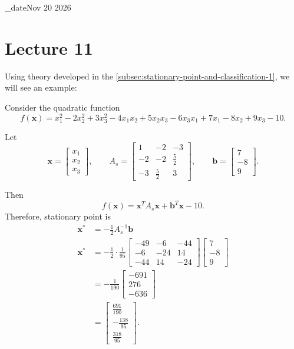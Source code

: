 \lecture_date{Nov 20 2026}
\chapter{Lecture 11}

Using theory developed in the \autoref{subsec:stationary-point-and-classification-1}, we will see an example:
\begin{example}\label{ex:lecture-11-1}
	Consider the quadratic function
	\begin{equation}
		f(\mathbf{x}) = x_1^2 - 2x_2^2 + 3x_3^2 - 4x_1x_2 + 5x_2x_3 - 6x_3x_1 + 7x_1 - 8x_2 + 9x_3 - 10.
		\label{eq:lecture-11-1}
	\end{equation}

	Let
	\[
		\mathbf{x} =
		\begin{bmatrix}
			x_1 \\ x_2 \\ x_3
		\end{bmatrix},
		\qquad
		A_s =
		\begin{bmatrix}
			1  & -2          & -3          \\
			-2 & -2          & \frac{5}{2} \\
			-3 & \frac{5}{2} & 3
		\end{bmatrix},
		\qquad
		\mathbf{b} =
		\begin{bmatrix}
			7 \\ -8 \\ 9
		\end{bmatrix}.
	\]

	Then
	\[
		f(\mathbf{x}) = \mathbf{x}^T A_s \mathbf{x} + \mathbf{b}^T \mathbf{x} - 10.
	\]
	Therefore, stationary point is
	\begin{equation}
		\begin{aligned}
			\mathbf{x}^* & = -\frac{1}{2}A_s^{-1}\mathbf{b} \\
			\mathbf{x}^*
			             & = -\frac{1}{2}\cdot\frac{1}{95}
			\begin{bmatrix}
				-49 & -6  & -44 \\
				-6  & -24 & 14  \\
				-44 & 14  & -24
			\end{bmatrix}
			\begin{bmatrix}
				7 \\ -8 \\ 9
			\end{bmatrix}                                  \\[8pt]
			             & = -\frac{1}{190}
			\begin{bmatrix}
				-691 \\ 276 \\ -636
			\end{bmatrix}                              \\[8pt]
			             & =
			\begin{bmatrix}
				\frac{691}{190} \\[4pt]
				-\frac{138}{95} \\[4pt]
				\frac{318}{95}
			\end{bmatrix}.
		\end{aligned}
		\label{eq:lecture-11-2}
	\end{equation}


\end{example}

